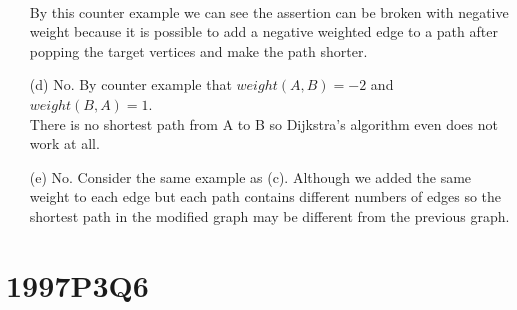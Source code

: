 \documentclass[10pt,twoside,a4paper]{article}
\begin{document}
\begin{itemize}
\\By this counter example we can see the assertion can be broken with negative weight because it is possible to add a negative weighted edge to a path after popping the target vertices and make the path shorter.
\item[(d)]
No. By counter example that $weight(A,B) = -2$ and $weight(B,A)=1$.
\\There is no shortest path from A to B so Dijkstra's algorithm even does not work at all.
\item[(e)]
No. Consider the same example as (c). Although we added the same weight to each edge but each path contains different numbers of edges so the shortest path in the modified graph may be different from the previous graph.
\end{itemize}
\section{1997P3Q6}
\end{document}
